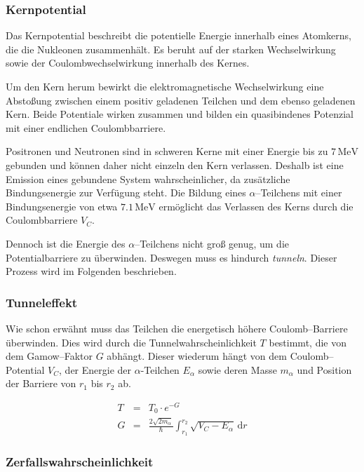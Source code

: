\documentclass[12pt,a4paper]{scrartcl}
\numberwithin{equation}{section} %
\begin{document}
\hypertarget{kernpotential}{%
\subsubsection{Kernpotential}\label{kernpotential}}

Das Kernpotential beschreibt die potentielle Energie innerhalb eines Atomkerns, die die Nukleonen zusammenhält. Es beruht auf der starken Wechselwirkung sowie der Coulombwechselwirkung innerhalb des Kernes.

Um den Kern herum bewirkt die elektromagnetische Wechselwirkung eine Abstoßung zwischen einem positiv geladenen Teilchen und dem ebenso geladenen Kern. Beide Potentiale wirken zusammen und bilden ein quasibindenes Potenzial mit einer endlichen Coulombbarriere.

Positronen und Neutronen sind in schweren Kerne mit einer Energie bis zu $7\mathrm{\,MeV}$ gebunden und können daher nicht einzeln den Kern verlassen. Deshalb ist eine Emission eines gebundene System wahrscheinlicher, da zusätzliche Bindungsenergie zur Verfügung steht. Die Bildung eines $\alpha$--Teilchens mit einer Bindungsenergie von etwa $7.1\mathrm{\,MeV}$ ermöglicht das Verlassen des Kerns durch die Coulombbarriere $V_C$.

Dennoch ist die Energie des $\alpha$--Teilchens nicht groß genug, um die Potentialbarriere zu überwinden. Deswegen muss es hindurch \emph{tunneln}. Dieser Prozess wird im Folgenden beschrieben.

\hypertarget{tunneleffekt}{%
\subsubsection{Tunneleffekt}\label{tunneleffekt}}

Wie schon erwähnt muss das Teilchen die energetisch höhere Coulomb--Barriere überwinden. Dies wird durch die Tunnelwahrscheinlichkeit $T$ bestimmt, die von dem Gamow--Faktor $G$ abhängt. Dieser wiederum hängt von dem Coulomb--Potential $V_C$, der Energie der $\alpha$-Teilchen $E_\alpha$ sowie deren Masse $m_\alpha$ und Position der Barriere von $r_1$ bis $r_2$ ab. \cite{Demtröder}

\begin{eqnarray}
    T &=& T_0 \cdot e^{-G} \\
    G &=&
        \frac{2\sqrt{2m_\alpha}}{\hbar}
        \int_{r_{1}}^{r_{2}}\sqrt{V_{C}-E_{\alpha}}
        \,\mathrm dr
\end{eqnarray}

\hypertarget{zerfallswahrscheinlichkeit}{%
\subsubsection{Zerfallswahrscheinlichkeit}\label{zerfallswahrscheinlichkeit}}
\end{document}
